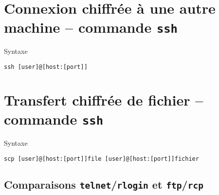 \section{Connexion chiffr{\'e}e {\`a} une autre machine -- commande {\tt ssh}}

\begin{definition}{Syntaxe}
\begin{verbatim}
ssh [user]@[host:[port]]
\end{verbatim}
\end{definition}

\section{Transfert chiffr{\'e}e de fichier -- commande {\tt ssh}}

\begin{definition}{Syntaxe}
\begin{verbatim}
scp [user]@[host:[port]]file [user]@[host:[port]]fichier 
\end{verbatim}
\end{definition}

\subsection{Comparaisons \texttt{telnet}/\texttt{rlogin} et \texttt{ftp}/\texttt{rcp}}

